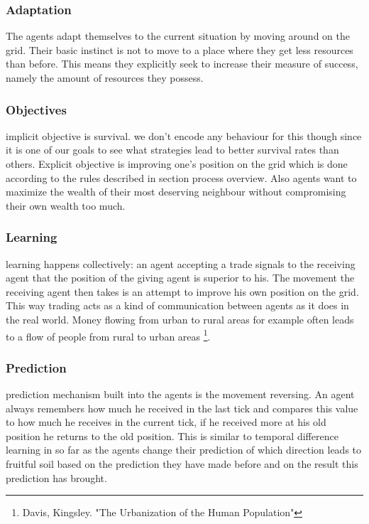 \documentclass{JASSS}
\begin{document}
\subsubsection{Adaptation}
	The agents adapt themselves to the current situation by moving around on the grid. Their basic instinct is not to move to a place where they get less resources than before. This means they explicitly seek to increase their measure of success, namely the amount of resources they possess.

\subsubsection{Objectives}
	implicit objective is survival. we don't encode any behaviour for this though since it is one of our goals to see what strategies lead to better survival rates than others. Explicit objective is improving one's position on the grid which is done according to the rules described in section process overview. Also agents want to maximize the wealth of their most deserving neighbour without compromising their own wealth too much.

\subsubsection{Learning}
	learning happens collectively: an agent accepting a trade signals to the receiving agent that the position of the giving agent is superior to his. The movement the receiving agent then takes is an attempt to improve his own position on the grid. This way trading acts as a kind of communication between agents as it does in the real world. Money flowing from urban to rural areas for example often leads to a flow of people from rural to urban areas \footnote{Davis, Kingsley. "The Urbanization of the Human Population"}.

\subsubsection{Prediction}
	 prediction mechanism built into the agents is the movement reversing. An agent always remembers how much he received in the last tick and compares this value to how much he receives in the current tick, if he received more at his old position he returns to the old position. This is similar to temporal difference learning in so far as the agents change their prediction of which direction leads to fruitful soil based on the prediction they have made before and on the result this prediction has brought.
\end{document}
